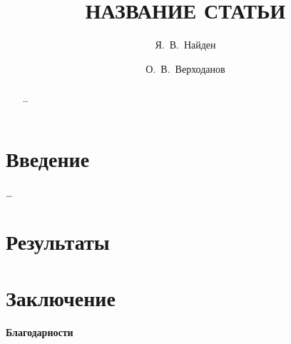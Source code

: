 \documentclass[aps,12pt,final,notitlepage,oneside,onecolumn,nobibnotes,%
nofootinbib,superscriptaddress,noshowpacs,centertags]{revtex4}
\begin{document}

    \title{НАЗВАНИЕ СТАТЬИ}

    \author{Я.~В.~Найден}
    \affiliation{\saonamer}

    \author{О.~В.~Верходанов}
    \affiliation{\saonamer}


    \begin{abstract}
        \ldots
    \end{abstract}

    \maketitle

    \section{Введение}
        \ldots

    \section{Результаты}

    \section{Заключение}

    \textbf{Благодарности}

\end{document}
